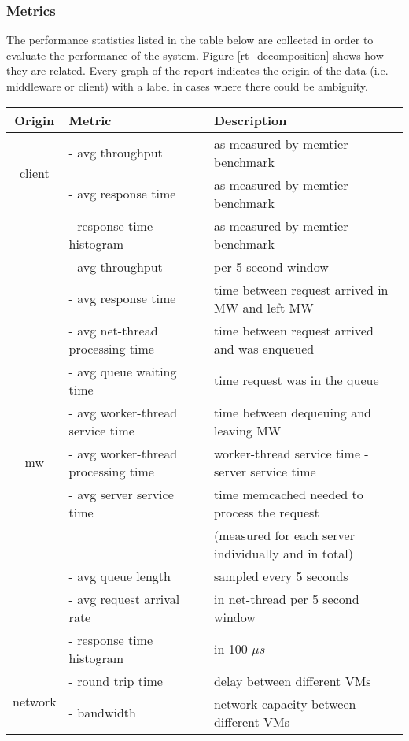 \documentclass[report.tex]{subfiles}
\begin{document}

\subsubsection{Metrics}\label{measured-points}

The performance statistics listed in the table below are collected in order to evaluate the performance of the system. Figure \ref{rt_decomposition} shows how they are related.
Every graph of the report indicates the origin of the data (i.e. middleware or client) with a label in cases where there could be ambiguity.

\begin{center}
\scriptsize{
\begin{tabular}{|c|l|l|}
	\hline 
	\textbf{Origin} & \textbf{Metric} & \textbf{Description} \Tstrut \\ 
	\hline 
	\multirow{2}{*}{client} & - avg throughput & as measured by memtier benchmark \Tstrut \\ 
	& - avg response time & as measured by memtier benchmark \\ 
	& - response time histogram & as measured by memtier benchmark \\
	\hline 
	\multirow{11}{*}{mw} & - avg throughput & per 5 second window \Tstrut \\ 
	& - avg response time & time between request arrived in MW and left MW\\ 
	& - avg net-thread processing time & time between request arrived and was enqueued\\  
	& - avg queue waiting time & time request was in the queue \\ 
	& - avg worker-thread service time &  time between dequeuing and leaving MW\\ 
	& - avg worker-thread processing time &  worker-thread service time - server service time\\ 
	& - avg server service time & time memcached needed to process the request \\  
	& & (measured for each server individually and in total) \\
	& - avg queue length & sampled every 5 seconds \\  
	& - avg request arrival rate & in net-thread per 5 second window \\ 
	& - response time histogram & in 100 $\mu s$ \\
	\hline
	\multirow{2}{*}{network} & - round trip time & delay between different VMs \Tstrut \\
	& - bandwidth & network capacity between different VMs \\
	\hline 
\end{tabular}}
\end{center}
\end{document}
